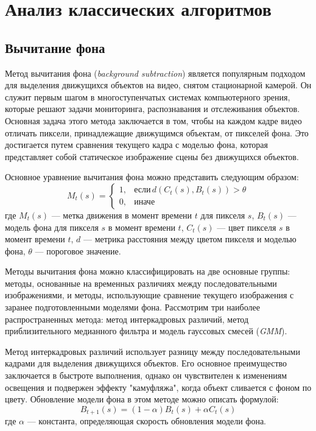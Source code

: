 \section{Анализ классических алгоритмов}
\subsection{Вычитание фона}
Метод вычитания фона (\textit{background subtraction}) является популярным подходом для выделения движущихся объектов на видео, снятом стационарной камерой. Он служит первым шагом в многоступенчатых системах компьютерного зрения, которые решают задачи мониторинга, распознавания и отслеживания объектов. Основная задача этого метода заключается в том, чтобы на каждом кадре видео отличать пиксели, принадлежащие движущимся объектам, от пикселей фона. Это достигается путем сравнения текущего кадра с моделью фона, которая представляет собой статическое изображение сцены без движущихся объектов.

Основное уравнение вычитания фона можно представить следующим образом:
\[ M_t(s) = \begin{cases} 
1, & \text{если} \, d(C_t(s), B_t(s)) > \theta \\
0, & \text{иначе}
\end{cases} \]
где \( M_t(s) \) — метка движения в момент времени \( t \) для пикселя \( s \), \( B_t(s) \) — модель фона для пикселя \( s \) в момент времени \( t \), \( C_t(s) \) — цвет пикселя \( s \) в момент времени \( t \), \( d \) — метрика расстояния между цветом пикселя и моделью фона, \( \theta \) — пороговое значение.

Методы вычитания фона можно классифицировать на две основные группы: методы, основанные на временных различиях между последовательными изображениями, и методы, использующие сравнение текущего изображения с заранее подготовленными моделями фона. Рассмотрим три наиболее распространенных метода: метод интеркадровых различий, метод приблизительного медианного фильтра и модель гауссовых смесей (\textit{GMM}).

Метод интеркадровых различий использует разницу между последовательными кадрами для выделения движущихся объектов. Его основное преимущество заключается в быстроте выполнения, однако он чувствителен к изменениям освещения и подвержен эффекту "камуфляжа"{}, когда объект сливается с фоном по цвету. Обновление модели фона в этом методе можно описать формулой:
\[ B_{t+1}(s) = (1 - \alpha) B_t(s) + \alpha C_t(s) \]
где \( \alpha \) — константа, определяющая скорость обновления модели фона.

